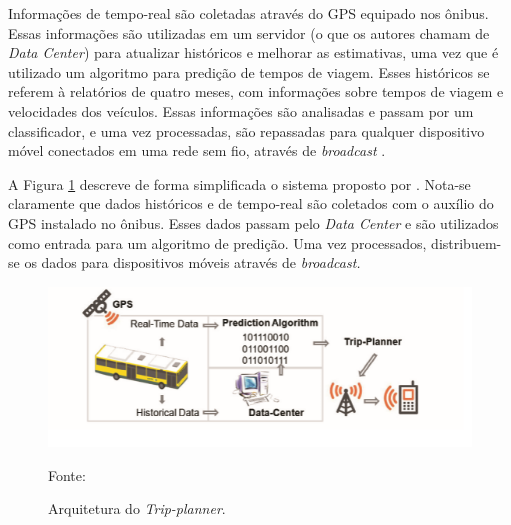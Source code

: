Informações de tempo-real são coletadas através do GPS equipado nos ônibus. Essas informações são utilizadas em um servidor (o que os autores chamam de \emph{Data Center}) para atualizar históricos e melhorar as estimativas, uma vez que é utilizado um algoritmo para predição de tempos de viagem. Esses históricos se referem à relatórios de quatro meses, com informações sobre tempos de viagem e velocidades dos veículos. Essas informações são analisadas e passam por um classificador, e uma vez processadas, são repassadas para qualquer dispositivo móvel conectados em uma rede sem fio, através de \emph{broadcast} \cite{alves}.

\newpage

A Figura \ref{fig:archLisbon} descreve de forma simplificada o sistema proposto por . Nota-se claramente que dados históricos e de tempo-real são coletados com o auxílio do GPS instalado no ônibus. Esses dados passam pelo \emph{Data Center} e são utilizados como entrada para um algoritmo de predição. Uma vez processados, distribuem-se os dados para dispositivos móveis através de \emph{broadcast.}

\begin{figure}[h]
\begin{center}
    \includegraphics[width=0.85\columnwidth]{../figs/arch_lisbon.png}
    \caption{Arquitetura do \emph{Trip-planner}.}Fonte: \cite{alves}
    \label{fig:archLisbon}
\end{center}
\end{figure}